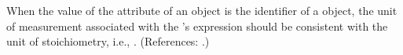 When the value of the attribute  of an \EventAssignment
object is the identifier of a \SpeciesReference object, the unit of
measurement associated with the \EventAssignment's  expression
should be consistent with the unit of stoichiometry, i.e.,
.  (References: .)
